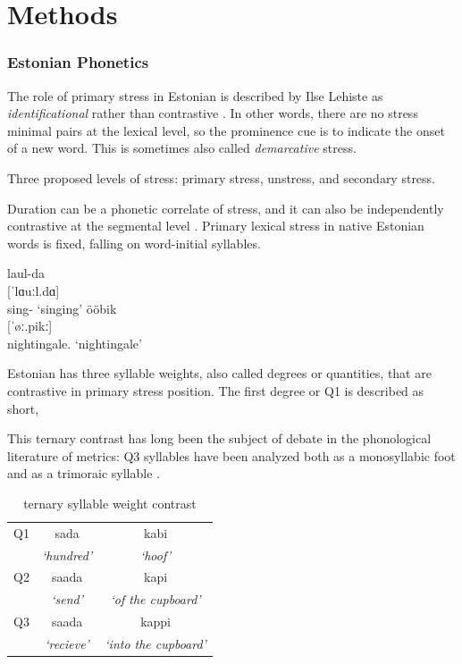 \chapter{Methods}
%
\subsection{Estonian Phonetics}
The role of primary stress in Estonian is described by Ilse Lehiste as {\it identificational} rather than contrastive \citep{lehistePhoneticsMetrics1992}. In other words, there are no stress minimal pairs at the lexical level, so the prominence cue is to indicate the onset of a new word. This is sometimes also called {\it demarcative} stress.



Three proposed levels of stress: primary stress, unstress, and secondary stress. \citep{lippusAcousticStudyEstonian2014a}

Duration can be a phonetic correlate of stress, and it can also be independently contrastive at the segmental level \citep{lehistePhoneticsMetrics1992}. 
Primary lexical stress in native Estonian words is fixed, falling on word-initial syllables. 
\cite{eekmeisterUralica98}
\begin{exe}
\ex \gll laul-da \\
	{[ˈlɑuːl.dɑ]} \\
	sing-\Tr{} 
	\glt	`singing'
\ex 	ööbik \\
	{[ˈøː.pikː]} \\
	nightingale.\Nom{} 
	\glt`nightingale'
\end{exe}

Estonian has three syllable weights, also called degrees or quantities, that are contrastive in primary stress position. The first degree or Q1 is described as short, 

This ternary contrast has long been the subject of debate in the phonological literature of metrics: Q3 syllables have been analyzed both as a monosyllabic foot \citep{princeMetricalTheoryEstonian1980} and as a trimoraic syllable \citep{hayesCompensatoryLengtheningMoraic1989, kuznetsovaEstonianWordProsody2018,prillopMoraeEstonianReply2020}. 


 \begin{table}[htb]
\centering
\begin{tabular}{lcc}
\hline

Q1 &		 sada 		& 	kabi  \\  
	&	 {\it `hundred'} 	&	 {\it`hoof' }\\
\hline
Q2 &		saada 		&	kapi \\
	&	 {\it`send' }		&	{\it`of the cupboard' }		\\
\hline
Q3 &		saada 	&	 kappi 	\\
	&	{\it`recieve' }	&	{\it`into the cupboard' }	\\
\hline
\end{tabular}
\label{qexamps}
\caption{ternary syllable weight contrast}
\end{table}



